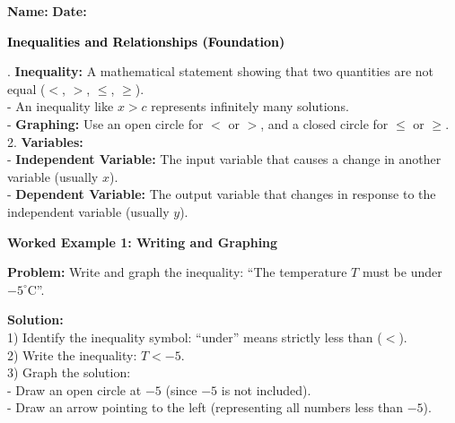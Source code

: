 \documentclass[12pt, letterpaper, fleqn]{article}
\begin{document}
\textbf{Name:} \underline{\hspace{5cm}}
\hfill
\textbf{Date:} \underline{\hspace{3cm}}\\

\begin{tcolorbox}[colback=black!10]
    \large\textcolor{black}{\textbf{Inequalities and Relationships (Foundation)}}
\end{tcolorbox}

\vspace{3mm}

. \textbf{Inequality:} A mathematical statement showing that two quantities are not equal ($<$, $>$, $\le$, $\ge$). \\
- An inequality like $x > c$ represents infinitely many solutions. \\
- \textbf{Graphing:} Use an open circle for $<$ or $>$, and a closed circle for $\le$ or $\ge$. \\
2. \textbf{Variables:} \\
- \textbf{Independent Variable:} The input variable that causes a change in another variable (usually $x$). \\
- \textbf{Dependent Variable:} The output variable that changes in response to the independent variable (usually $y$).

\vspace{4mm}

\begin{tcolorbox}[colback=white, colframe=black!25, boxrule=0.6pt, arc=4mm, left=6mm, right=6mm, top=5mm, bottom=5mm]
\textbf{Worked Example 1: Writing and Graphing}

\medskip
\noindent
\textbf{Problem:} Write and graph the inequality: ``The temperature $T$ must be under $-5^\circ\text{C}$''.

\medskip
\noindent
\textbf{Solution:} \\
1) Identify the inequality symbol: ``under'' means strictly less than ($<$). \\
2) Write the inequality: $T < -5$. \\
3) Graph the solution: \\
- Draw an open circle at $-5$ (since $-5$ is not included). \\
- Draw an arrow pointing to the left (representing all numbers less than $-5$).
\end{tcolorbox}
\end{document}

